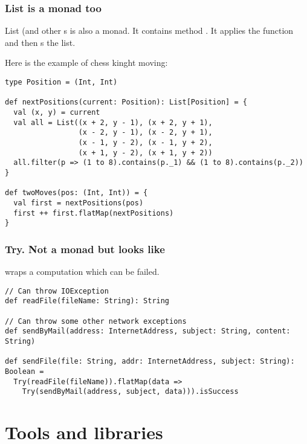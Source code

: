 \documentclass{beamer}
\begin{document}
\begin{frame}[fragile]
\frametitle{List is a monad too}
List (and other s is also a monad. It contains method .
It applies the function and then s the list.

Here is the example of chess kinght moving:
\begin{lstlisting}
type Position = (Int, Int)

def nextPositions(current: Position): List[Position] = {
  val (x, y) = current
  val all = List((x + 2, y - 1), (x + 2, y + 1),
                 (x - 2, y - 1), (x - 2, y + 1),
                 (x - 1, y - 2), (x - 1, y + 2),
                 (x + 1, y - 2), (x + 1, y + 2))
  all.filter(p => (1 to 8).contains(p._1) && (1 to 8).contains(p._2))
}

def twoMoves(pos: (Int, Int)) = {
  val first = nextPositions(pos)
  first ++ first.flatMap(nextPositions)
}
\end{lstlisting}

\end{frame}

\begin{frame}[fragile]
\frametitle{Try. Not a monad but looks like}

 wraps a computation which can be failed.

\begin{lstlisting}
// Can throw IOException
def readFile(fileName: String): String

// Can throw some other network exceptions
def sendByMail(address: InternetAddress, subject: String, content: String)

def sendFile(file: String, addr: InternetAddress, subject: String): Boolean =
  Try(readFile(fileName)).flatMap(data =>
    Try(sendByMail(address, subject, data))).isSuccess

\end{lstlisting}

\end{frame}

\section{Tools and libraries}
\end{document}
